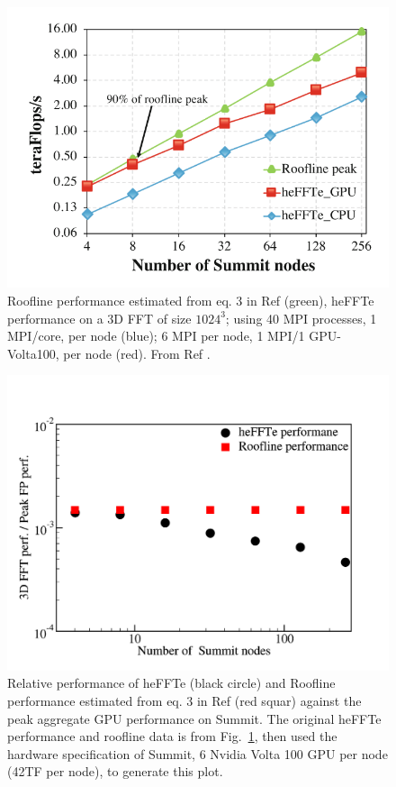 \begin{figure}[ht]
    \centering\includegraphics[width=0.8\linewidth]{figures/heFFTe.png}
    \caption{Roofline performance estimated from eq. 3 in Ref \cite{heFFTe2020} (green), heFFTe performance on a 3D FFT of size $1024^3$; using 40 MPI processes, 1 MPI/core, per node (blue); 6 MPI per node, 1 MPI/1 GPU-Volta100, per node (red). From Ref \cite{heFFTe2020}.}
    \label{fig:heFFTe}
\end{figure}

\begin{figure}[ht]
    \centering\includegraphics[width=0.8\linewidth]{figures/FFTPerfOnSummit.pdf}
    \caption{Relative performance of heFFTe (black circle) and Roofline performance estimated from eq. 3 in Ref \cite{heFFTe2020} (red squar) against the peak aggregate GPU performance on Summit. The original heFFTe performance and roofline data is from Fig.~\ref{fig:heFFTe}, then used the hardware specification of Summit, 6 Nvidia Volta 100 GPU per node (42TF per node), to generate this plot.}
    \label{fig:heFFTeRel}
\end{figure}


